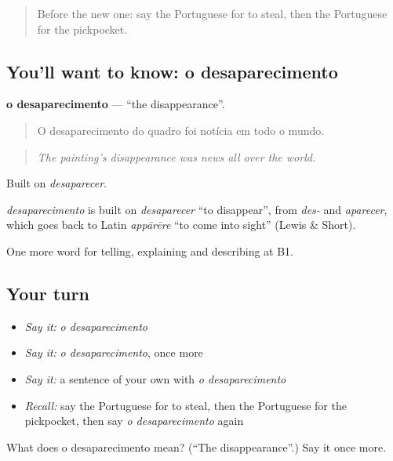 \label{lesson:PT-C287-desaparecimento}



\begin{quote}
Before the new one: say the Portuguese for to steal, then the Portuguese for the pickpocket.
\end{quote}

\subsection*{You'll want to know: o desaparecimento}
\textbf{o desaparecimento} — \textquotedblleft{}the disappearance\textquotedblright{}.

\begin{quote}
O desaparecimento do quadro foi notícia em todo o mundo.
\end{quote}

\begin{quote}
\emph{The painting’s disappearance was news all over the world.}
\end{quote}

Built on \emph{desaparecer}.

\begin{cousinweb}
\emph{desaparecimento} is built on \emph{desaparecer} \textquotedblleft{}to disappear\textquotedblright{}, from \emph{des-} and \emph{aparecer}, which goes back to Latin \emph{appārēre} \textquotedblleft{}to come into sight\textquotedblright{} (Lewis \& Short).
\end{cousinweb}

\begin{grammarlens}[title={What you've built}]
One more word for telling, explaining and describing at B1.
\end{grammarlens}

\subsection*{Your turn}
\begin{itemize}
\raggedright
  \item \emph{Say it:} \emph{o desaparecimento}
  \item \emph{Say it:} \emph{o desaparecimento}, once more
  \item \emph{Say it:} a sentence of your own with \emph{o desaparecimento}
  \item \emph{Recall:} say the Portuguese for to steal, then the Portuguese for the pickpocket, then say \emph{o desaparecimento} again
\end{itemize}

\begin{tcolorbox}[breakable,colback=teal!4,colframe=teal!35!black,title={Before you move on}]
What does o desaparecimento mean? (\textquotedblleft{}The disappearance\textquotedblright{}.) Say it once more.
\end{tcolorbox}
